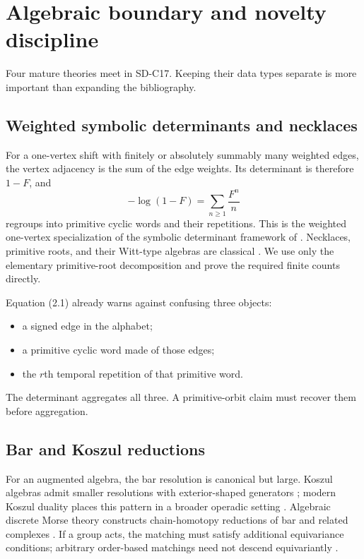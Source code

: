 \section{Algebraic boundary and novelty discipline}
\label{sec:boundary}

Four mature theories meet in SD-C17.  Keeping their data types separate is
more important than expanding the bibliography.

\subsection{Weighted symbolic determinants and necklaces}

For a one-vertex shift with finitely or absolutely summably many weighted
edges, the vertex adjacency is the sum of the edge weights.  Its determinant
is therefore $1-F$, and
\[
  -\log(1-F)=\sum_{n\ge1}\frac{F^n}{n}
  \tag{2.1}
\]
regroups into primitive cyclic words and their repetitions.  This is the
weighted one-vertex specialization of the symbolic determinant framework of
\citet{bowenlanford1970}.  Necklaces, primitive roots, and their Witt-type
algebras are classical \citep{metropolisrota1983}.  We use only the elementary
primitive-root decomposition and prove the required finite counts directly.

Equation (2.1) already warns against confusing three objects:

\begin{itemize}
\item a signed edge in the alphabet;
\item a primitive cyclic word made of those edges;
\item the $r$th temporal repetition of that primitive word.
\end{itemize}

The determinant aggregates all three.  A primitive-orbit claim must recover
them before aggregation.

\subsection{Bar and Koszul reductions}

For an augmented algebra, the bar resolution is canonical but large.
Koszul algebras admit smaller resolutions with exterior-shaped generators
\citep{priddy1970}; modern Koszul duality places this pattern in a broader
operadic setting \citep{ginzburgkapranov1994}.  Algebraic discrete Morse
theory constructs chain-homotopy reductions of bar and related complexes
\citep{skoldberg2006,jollenbeckwelker2009}.  If a group acts, the matching
must satisfy additional equivariance conditions; arbitrary order-based
matchings need not descend equivariantly \citep{freij2009}.

